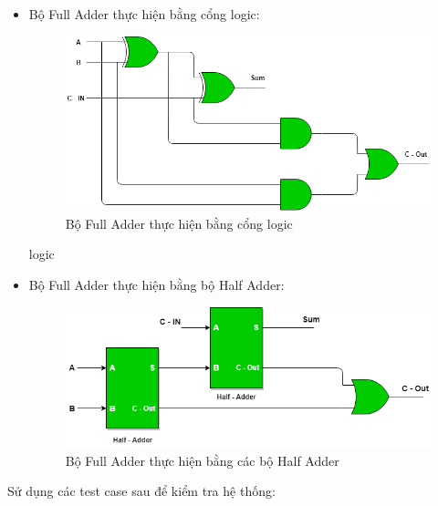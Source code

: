 \begin{itemize}[label = -]
	\item Bộ Full Adder thực hiện bằng cổng logic:\\
		\begin{figure}[H]
			\centering
			\includegraphics[width = .5\linewidth]{./image/full_adder_circuitcircuit.png}
			\caption{Bộ Full Adder thực hiện bằng cổng logic}
			\label{f_full adder circuit}
		\end{figure}
		
		logic
	\item Bộ Full Adder thực hiện bằng bộ Half Adder:\\
		\begin{figure}[H]
			\centering
			\includegraphics[width = 0.5\linewidth]{./image/full_adder_with_half_adder.png}
			\caption{Bộ Full Adder thực hiện bằng các bộ Half Adder}
			\label{f_full adder with half adder}
		\end{figure}
		
		
\end{itemize}

Sử dụng các test case sau để kiểm tra hệ thống:

